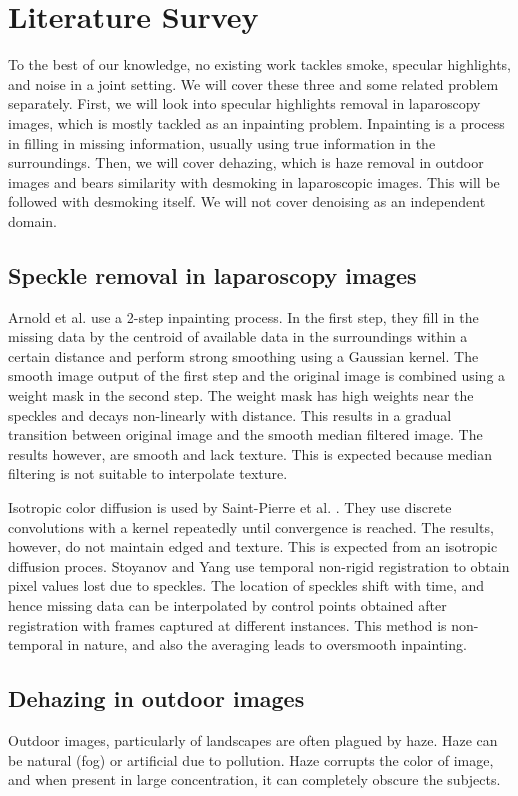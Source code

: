
\chapter{Literature Survey}

To the best of our knowledge, no existing work tackles smoke, specular highlights, and noise in a joint setting. We will cover these three and some related problem separately. First, we will look into specular highlights removal in laparoscopy images, which is mostly tackled as an inpainting problem. Inpainting is a process in filling in missing information, usually using true information in the surroundings. Then, we will cover dehazing, which is haze removal in outdoor images and bears similarity with desmoking in laparoscopic images. This will be followed with desmoking itself. We will not cover denoising as an independent domain.

\section{Speckle removal in laparoscopy images}
Arnold et al.\cite{arnold2010speckle} use a 2-step inpainting process. In the first step, they fill in the missing data by the centroid of available data in the surroundings within a certain distance and perform strong smoothing using a Gaussian kernel. The smooth image output of the first step and the original image is combined using a weight mask in the second step. The weight mask has high weights near the speckles and decays non-linearly with distance. This results in a gradual transition between original image and the smooth median filtered image. The results however, are smooth and lack texture. This is expected because median filtering is not suitable to interpolate texture.

Isotropic color diffusion is used by Saint-Pierre et al. \cite{saint2011detection}. They use discrete convolutions with a kernel repeatedly until convergence is reached. The results, however, do not maintain edged and texture. This is expected from an isotropic diffusion proces. Stoyanov and Yang \cite{stoyanov2005removing} use temporal non-rigid registration to obtain pixel values lost due to speckles. The location of speckles shift with time, and hence missing data can be interpolated by control points obtained after registration with frames captured at different instances. This method is non-temporal in nature, and also the averaging leads to oversmooth inpainting.

\section{Dehazing in outdoor images}
Outdoor images, particularly of landscapes are often plagued by haze. Haze can be natural (fog) or artificial due to pollution. Haze corrupts the color of image, and when present in large concentration, it can completely obscure the subjects.

